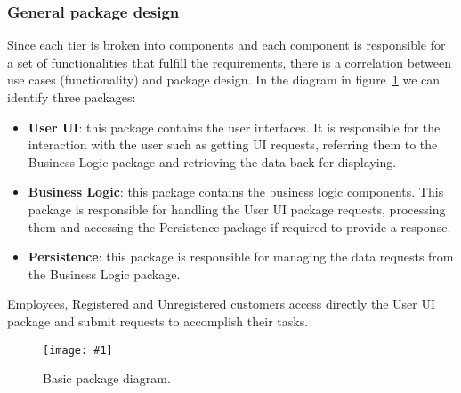 \documentclass[a4paper,12pt]{book}
\newcommand{\insimg}[3]{
  \begin{figure}[H]
    \begin{center}
      \texttt{[image: \#1]}
    \end{center}
    \caption{#2}
    \label{fig:#1}
  \end{figure}
}
\begin{document}
\subsubsection{General package design}
Since each tier is broken into components and each component is responsible for a set of functionalities that fulfill the requirements, there is a correlation between use cases (functionality) and package design. In the diagram in figure~\ref{fig:basic-package} we can identify three packages:
\begin{itemize}
  \item \textbf{User UI}: this package contains the user interfaces. It is responsible for the interaction with the user such as getting UI requests, referring them to the Business Logic package and retrieving the data back for displaying.
  \item \textbf{Business Logic}: this package contains the business logic components. This package is responsible for handling the User UI package requests, processing them and accessing the Persistence package if required to provide a response.
  \item \textbf{Persistence}: this package is responsible for managing the data requests from the Business Logic package.
\end{itemize}
Employees, Registered and Unregistered customers access directly the User UI package and submit requests to accomplish their tasks.

\insimg{basic-package}{Basic package diagram.}{0.4}
\end{document}
